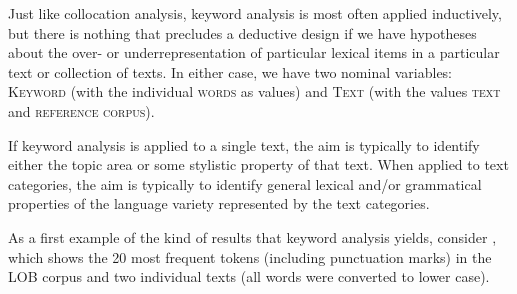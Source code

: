 Just like collocation  analysis, keyword  analysis is most often applied inductively,  but there is nothing that precludes a deductive  design  if we have hypotheses about the over- or underrepresentation of particular lexical items in a particular text or collection of texts. In either case, we have two nominal  variables: \textsc{Keyword} (with the individual \textsc{words} as values) and \textsc{Text} (with the values \textsc{text} and \textsc{reference corpus}).

If keyword  analysis is applied to a single text, the aim is typically to identify either the topic area or some stylistic  property of that text. When applied to text categories, the aim is typically to identify general lexical and\slash or grammatical  properties of the language variety  represented by the text categories.

As a first example of the kind of results that keyword  analysis yields, consider , which shows the 20 most frequent tokens  (including punctuation marks) in the LOB  corpus and two individual texts (all words were converted to lower case).

